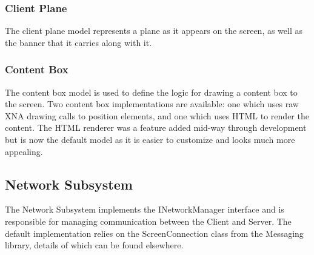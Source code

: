 \subsubsection{Client Plane}
The client plane model represents a plane as it appears on the screen, as well
as the banner that it carries along with it.

\subsubsection{Content Box}
The content box model is used to define the logic for drawing a content box to
the screen. Two content box implementations are available: one which uses raw
XNA drawing calls to position elements, and one which uses HTML to render the
content. The HTML renderer was a feature added mid-way through development but
is now the default model as it is easier to customize and looks much more
appealing. 

\subsection{Network Subsystem}
The Network Subsystem implements the INetworkManager interface and is 
responsible for managing communication between the Client and Server. The 
default implementation relies on the ScreenConnection class from the Messaging
library, details of which can be found elsewhere. 


